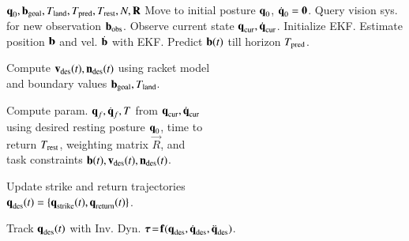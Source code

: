 \begin{algorithm}[t]
\begin{mdframed}
\small\sf\centering
\caption{$\Alg$ ($\alg$)}
\label{alg1}
\begin{minipage}{\linewidth}
\begin{algorithmic}[1]
   \Require $\boldsymbol{\mathrm{q}}_0, \boldsymbol{\mathrm{b}}_{\mathrm{goal}}, T_{\mathrm{land}}, T_{\mathrm{pred}}, T_{\mathrm{rest}}, N, \boldsymbol{\mathrm{R}}$ %
   \State Move to initial posture $\boldsymbol{\mathrm{q}}_0$, $\dot{\boldsymbol{\mathrm{q}}}_0 = \boldsymbol{\mathrm{0}}$.
   \Loop
	   \State Query vision sys. for new observation $\boldsymbol{\mathrm{b}}_{\mathrm{obs}}$.
   	   \State Observe current state $\boldsymbol{\mathrm{q}}_{\mathrm{cur}}, \dot{\boldsymbol{\mathrm{q}}}_{\mathrm{cur}}$.
	       \State Initialize EKF.
       \EndIf
	       \State Estimate position $\boldsymbol{\mathrm{b}}$ and vel. $\dot{\boldsymbol{\mathrm{b}}}$ with EKF.
		   \State Predict $\boldsymbol{\mathrm{b}}(t)$ till horizon $T_{\mathrm{pred}}$.
		   \State \parbox[t]{\dimexpr\linewidth-\algorithmicindent}{Compute $\boldsymbol{\mathrm{v}}_{\mathrm{des}}(t), \boldsymbol{\mathrm{n}}_{\mathrm{des}}(t)$ using racket model \\ and boundary values $\boldsymbol{\mathrm{b}}_{\mathrm{goal}}, T_{\mathrm{land}}$.}
	   	   \State \parbox[t]{\dimexpr\linewidth-\algorithmicindent}{Compute param. $\boldsymbol{\mathrm{q}}_f, \dot{\boldsymbol{\mathrm{q}}}_f, T$ from $\boldsymbol{\mathrm{q}}_{\mathrm{cur}}, \dot{\boldsymbol{\mathrm{q}}}_{\mathrm{cur}}$ \\ using desired resting posture $\boldsymbol{\mathrm{q}}_0$, time to \\return $T_{\mathrm{rest}}$, weighting matrix $\vec{R}$, and \\task constraints $\boldsymbol{\mathrm{b}}(t),\boldsymbol{\mathrm{v}}_{\mathrm{des}}(t), \boldsymbol{\mathrm{n}}_{\mathrm{des}}(t)$.}
		   \State \parbox[t]{\dimexpr\linewidth-\algorithmicindent}{Update strike and return trajectories \\ $\boldsymbol{\mathrm{q}}_{\mathrm{des}}(t) = \{\boldsymbol{\mathrm{q}}_{\mathrm{strike}}(t), \boldsymbol{\mathrm{q}}_{\mathrm{return}}(t)\}$.}
	   \EndIf
	   \State \parbox[t]{\dimexpr\linewidth-\algorithmicindent}{Track $\boldsymbol{\mathrm{q}}_{\mathrm{des}}(t)$ with Inv. Dyn. $\boldsymbol{\mathrm{\tau}} \!=\! \boldsymbol{\mathrm{f}}(\boldsymbol{\mathrm{q}}_{\mathrm{des}},\dot{\boldsymbol{\mathrm{q}}}_{\mathrm{des}},\ddot{\boldsymbol{\mathrm{q}}}_{\mathrm{des}})$.} %
   \EndLoop
\end{algorithmic}
\end{minipage}
\end{mdframed}
\end{algorithm}

